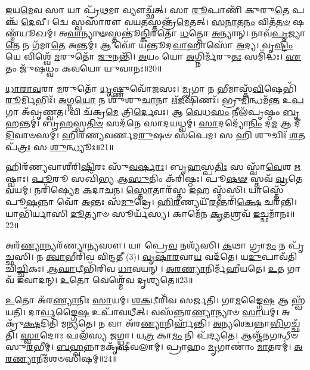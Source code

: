 \-\ul{𑌇}\-𑌯\-\ul{𑌮𑍇}\-𑌵 𑌸𑌾 𑌯𑌾 𑌪𑍍𑌰᳴\-\ul{𑌥}\-𑌮𑌾 𑌵𑍍𑌯𑍗𑌚𑍍𑌛᳴𑌤𑍍।
𑌸𑌾 \ul{𑌰𑍂}\-𑌪𑌾𑌣𑌿᳴ 𑌕𑍁𑌰𑍁\-\ul{𑌤𑍇} 𑌪𑌞𑍍𑌚᳴ \ul{𑌦𑍇}\-𑌵𑍀।
𑌦𑍍𑌵𑍇 𑌸𑍍𑌵𑌸𑌾᳴𑌰𑍗 𑌵𑌯\-\ul{𑌤}\-𑌸𑍍𑌤𑌨𑍍𑌤𑍍𑌰᳴\-\ul{𑌮𑍇}\-𑌤𑌤𑍍।
\-\ul{𑌸}\-\-\ul{𑌨𑌾}\-𑌤\-\ul{𑌨𑌂} 𑌵𑌿𑌤᳴\-\ul{𑌤}\-\-\ul{𑍞} 𑌷𑌣𑍍𑌮᳴𑌯𑍂𑌖𑌮𑍍।
𑌅\-\ul{𑌵𑌾}\-𑌨𑍍𑌯𑌾𑍟𑌸𑍍𑌤𑌨𑍍𑌤𑍂॑\-\ul{𑌨𑍍𑌕𑌿}\-𑌰𑌤𑍋᳴ \ul{𑌧}\-𑌤𑍍𑌤𑍋 \ul{𑌅}\-𑌨𑍍𑌯𑌾𑌨𑍍।
𑌨𑌾𑌵᳴\-\ul{𑌪𑍃}\-𑌜𑍍𑌯𑌾\-\ul{𑌤𑍇} 𑌨 𑌗᳴𑌮𑌾\-\ul{𑌤𑍇} 𑌅𑌨𑍍𑌤𑌮𑍍॑।
𑌆 𑌵𑍋᳴ 𑌯𑌨𑍍𑌤𑍂𑌦\-\ul{𑌵𑌾}\-𑌹𑌾𑌸𑍋᳴ \ul{𑌅}\-𑌦𑍍𑌯।
𑌵𑍃\-\ul{𑌷𑍍𑌟𑌿𑌂} 𑌯𑍇 𑌵𑌿𑌶𑍍𑌵𑍇᳴ \ul{𑌮}\-𑌰𑍁𑌤𑍋᳴ \ul{𑌜𑍁}\-𑌨𑌨𑍍𑌤𑌿᳴।
\-\ul{𑌅}\-𑌯𑌂 𑌯𑍋 \ul{𑌅}\-𑌗𑍍𑌨𑌿𑌰𑍍𑌮᳴𑌰𑍁\-\ul{𑌤𑌃} 𑌸𑌮𑌿᳴𑌦𑍍𑌧𑌃।
\-\ul{𑌏}\-𑌤𑌂 𑌜𑍁᳴𑌷𑌧𑍍𑌵𑌂 𑌕𑌵𑌯𑍋 𑌯𑍁𑌵𑌾𑌨𑌃॥20॥

\-\ul{𑌧𑌾}\-\-\ul{𑌰𑌾}\-\-\ul{𑌵}\-𑌰𑌾 \ul{𑌮}\-𑌰𑍁𑌤𑍋᳴ \ul{𑌧𑍃}\-𑌷𑍍𑌣𑍁𑌵𑍋᳴𑌜𑌸𑌃।
\-\ul{𑌮𑍃}\-𑌗𑌾 𑌨 \ul{𑌭𑍀}\-𑌮𑌾𑌸𑍍𑌤᳴\-\ul{𑌵𑌿}\-𑌷𑍇𑌭𑌿᳴\-\-\ul{𑌰𑍂}\-𑌰𑍍𑌮𑌿𑌭𑌿𑌃᳴।
\-\ul{𑌅}\-𑌗𑍍𑌨\-\ul{𑌯𑍋} 𑌨 𑌶𑍁᳴𑌶𑍁\-\ul{𑌚𑌾}\-𑌨𑌾 𑌋᳴\-\ul{𑌜𑍀}\-𑌷𑌿𑌣𑌃᳴।
𑌭𑍍𑌰𑍁\-\ul{𑌮𑌿}\-𑌨𑍍𑌧𑌮᳴\-\ul{𑌨𑍍𑌤} 𑌉\-\ul{𑌪} 𑌗𑌾 𑌅᳴𑌵𑍃𑌣𑍍𑌵𑌤।
𑌵𑌿 𑌚᳴𑌕𑍍𑌰\-\ul{𑌮𑍇} 𑌤𑍍𑌰𑌿\-\ul{𑌰𑍍𑌦𑍇}\-𑌵𑌃।
𑌆 \ul{𑌵𑍇}\-𑌧\-\ul{𑌸𑌂} 𑌨𑍀𑌲᳴𑌪𑍃𑌷𑍍𑌠𑌂 \ul{𑌬𑍃}\-𑌹𑌨𑍍𑌤𑌮𑍍॑।
𑌬𑍃\-\ul{𑌹}\-𑌸𑍍𑌪\-\ul{𑌤𑌿}\-\-\ul{𑍞} 𑌸𑌦᳴𑌨𑍇 𑌸𑌾𑌦𑌯𑌧𑍍𑌵𑌮𑍍।
\-\ul{𑌸𑌾}\-𑌦𑌦𑍍𑌯𑍋᳴\-\ul{𑌨𑌿𑌂} 𑌦\-\ul{𑌮} 𑌆 𑌦𑍀᳴\-\ul{𑌦𑌿}\-𑌵𑌾𑍞𑌸𑌮𑍍॑।
𑌹𑌿𑌰᳴𑌣𑍍𑌯𑌵𑌰𑍍𑌣𑌮\-\ul{𑌰𑍁}\-𑌷𑍞 𑌸᳴𑌪𑍇𑌮।
𑌸 𑌹𑌿 𑌶𑍁𑌚𑌿𑌃᳴ \ul{𑌶}\-𑌤𑌪᳴\-\ul{𑌤𑍍𑌰𑌃} 𑌸 \ul{𑌶𑍁}\-𑌨𑍍𑌧𑍍𑌯𑍂𑌃॥21॥

𑌹𑌿𑌰᳴𑌣𑍍𑌯𑌵𑌾𑌶𑍀𑌰𑌿\-\ul{𑌷𑌿}\-𑌰𑌃 𑌸𑍁᳴\-\ul{𑌵}\-\-\ul{𑌰𑍍}\-𑌷𑌾𑌃।
𑌬𑍃\-\ul{𑌹}\-𑌸𑍍𑌪\-\ul{𑌤𑌿𑌃} 𑌸 𑌸𑍍𑌵𑌾᳴\-\ul{𑌵𑍇}\-𑌶 \ul{𑌋}\-𑌷𑍍𑌵𑌾𑌃।
\-\ul{𑌪𑍂}\-𑌰𑍂 𑌸𑌖𑌿᳴𑌭𑍍𑌯 𑌆\-\ul{𑌸𑍁}\-𑌤𑌿𑌂 𑌕᳴𑌰𑌿𑌷𑍍𑌠𑌃।
𑌪𑍂\-\ul{𑌷}\-\-\ul{𑍟} 𑌸𑍍𑌤𑌵᳴ \ul{𑌵𑍍𑌰}\-𑌤𑍇 \ul{𑌵}\-𑌯𑌮𑍍।
𑌨𑌰𑌿᳴𑌷𑍍𑌯𑍇𑌮 \ul{𑌕}\-𑌦𑌾\-\ul{𑌚}\-𑌨।
\-\ul{𑌸𑍍𑌤𑍋}\-𑌤𑌾𑌰᳴𑌸𑍍𑌤 \ul{𑌇}\-𑌹 𑌸𑍍𑌮᳴𑌸𑌿।
𑌯𑌾𑌸𑍍𑌤𑍇᳴ 𑌪𑍂\-\ul{𑌷}\-𑌨𑍍𑌨𑌾 𑌵𑍋᳴ \ul{𑌅}\-𑌨𑍍𑌤𑌃 𑌸᳴\-\ul{𑌮𑍁}\-𑌦𑍍𑌰𑍇।
\-\ul{𑌹𑌿}\-\-\ul{𑌰}\-𑌣𑍍𑌯𑌯𑍀᳴\-\ul{𑌰}\-𑌨𑍍𑌤𑌰𑌿᳴\-\ul{𑌕𑍍𑌷𑍇} 𑌚𑌰᳴𑌨𑍍𑌤𑌿।
𑌯𑌾𑌭𑌿᳴𑌰𑍍𑌯𑌾𑌸𑌿 \ul{𑌦𑍂}\-𑌤𑍍𑌯𑌾𑍞 𑌸𑍂𑌰𑍍𑌯᳴𑌸𑍍𑌯।
𑌕𑌾𑌮𑍇᳴𑌨 \ul{𑌕𑍃}\-𑌤𑌶𑍍𑌰𑌵᳴ \ul{𑌇}\-𑌚𑍍𑌛𑌮𑌾᳴𑌨𑌃॥22॥

𑌅𑌰᳴\-\ul{𑌣𑍍𑌯𑌾}\-𑌨𑍍𑌯𑌰᳴𑌣𑍍𑌯𑌾\-\ul{𑌨𑍍𑌯}\-𑌸𑍗।
𑌯𑌾 𑌪𑍍𑌰𑍇\-\ul{𑌵} 𑌨𑌶𑍍𑌯᳴𑌸𑌿।
\-\ul{𑌕}\-𑌥𑌾 𑌗𑍍𑌰𑌾\-\ul{𑌮𑌂} 𑌨 𑌪𑍃᳴𑌚𑍍𑌛𑌸𑌿।
𑌨 \ul{𑌤𑍍𑌵𑌾}\-𑌭𑍀𑌰𑌿᳴𑌵 𑌵𑌿𑌨𑍍𑌦𑌤𑍀 (3)।
\-\ul{𑌵𑍃}\-\-\ul{𑌷𑌾}\-\-\ul{𑌰}\-𑌵𑌾\-\ul{𑌯} 𑌵𑌦᳴𑌤𑍇।
𑌯\-\ul{𑌦𑍁}\-𑌪𑌾𑌵᳴𑌤𑌿 𑌚𑌿\-\ul{𑌚𑍍𑌚𑌿}\-𑌕𑌃।
\-\ul{𑌆}\-\-\ul{𑌘𑌾}\-𑌟𑍀𑌭𑌿᳴𑌰𑌿𑌵 \ul{𑌧𑌾}\-𑌵𑌯𑌨𑍍।
\-\ul{𑌅}\-\-\ul{𑌰}\-\-\ul{𑌣𑍍𑌯𑌾}\-𑌨𑌿𑌰𑍍𑌮᳴𑌹𑍀𑌯𑌤𑍇।
\-\ul{𑌉}\-𑌤 𑌗𑌾𑌵᳴ 𑌇𑌵𑌾𑌦𑌨𑍍।
\-\ul{𑌉}\-𑌤𑍋 𑌵𑍇𑌶𑍍𑌮𑍇᳴𑌵 𑌦𑍃𑌶𑍍𑌯𑌤𑍇॥23॥

\-\ul{𑌉}\-𑌤𑍋 𑌅᳴𑌰\-\ul{𑌣𑍍𑌯𑌾}\-𑌨𑌿𑌃 \ul{𑌸𑌾}\-𑌯𑌮𑍍।
\-\ul{𑌶}\-\-\ul{𑌕}\-𑌟𑍀𑌰𑌿᳴𑌵 𑌸𑌰𑍍𑌜𑌤𑌿।
𑌗𑌾\-\ul{𑌮}\-𑌙𑍍𑌗𑍈\-\ul{𑌷} 𑌆 𑌹𑍍𑌵᳴𑌯𑌤𑌿।
𑌦𑌾\-\ul{𑌰𑍍𑌵}\-𑌙𑍍𑌗𑍈\-\ul{𑌷} 𑌉𑌪𑌾᳴𑌵𑌧𑍀𑌤𑍍।
𑌵𑌸᳴𑌨𑍍𑌨𑌰\-\ul{𑌣𑍍𑌯𑌾}\-𑌨𑍍𑌯𑌾𑍞 \ul{𑌸𑌾}\-𑌯𑌮𑍍।
𑌅𑌕𑍍𑌰𑍁᳴\-\ul{𑌕𑍍𑌷}\-𑌦𑌿𑌤𑌿᳴ 𑌮𑌨𑍍𑌯𑌤𑍇।
𑌨 𑌵𑌾 𑌅᳴𑌰\-\ul{𑌣𑍍𑌯𑌾}\-𑌨𑌿𑌰𑍍\mbox{}𑌹᳴𑌨𑍍𑌤𑌿।
\-\ul{𑌅}\-𑌨𑍍𑌯𑌶𑍍𑌚𑍇𑌨𑍍𑌨𑌾\-\ul{𑌭𑌿}\-𑌗𑌚𑍍𑌛᳴𑌤𑌿।
\-\ul{𑌸𑍍𑌵𑌾}\-𑌦𑍋𑌃 𑌫𑌲᳴𑌸𑍍𑌯 \ul{𑌜}\-𑌗𑍍𑌧𑍍𑌵𑌾।
𑌯\-\ul{𑌤𑍍𑌰} 𑌕𑌾\-\ul{𑌮𑌂} 𑌨𑌿 𑌪᳴𑌦𑍍𑌯𑌤𑍇।
𑌆𑌞𑍍𑌜᳴𑌨𑌗𑌨𑍍𑌧𑍀𑍞 𑌸𑍁\-\ul{𑌰}\-𑌭𑍀𑌮𑍍।
\-\ul{𑌬}\-\-\ul{𑌹𑍍𑌵}\-𑌨𑍍𑌨𑌾𑌮𑌕𑍃᳴𑌷𑍀𑌵𑌲𑌾𑌮𑍍।
𑌪𑍍𑌰𑌾𑌹𑌂 \ul{𑌮𑍃}\-𑌗𑌾𑌣𑌾𑌂॑ \ul{𑌮𑌾}\-𑌤𑌰𑌮𑍍॑।
\-\ul{𑌅}\-\-\ul{𑌰}\-\-\ul{𑌣𑍍𑌯𑌾}\-𑌨𑍀𑌮᳴𑌶𑍞𑌸𑌿𑌷𑌮𑍍॥24॥\anuvakamend[\-\ul{𑌸𑍍𑌯𑌾}\-\-\ul{𑌮} \ul{𑌰𑍁}\-\-\ul{𑌰𑍋}\-\-\ul{𑌹} \ul{𑌯𑍁}\-\-\ul{𑌵𑌾}\-\-\ul{𑌨𑌃} \ul{𑌶𑍁}\-𑌨𑍍𑌧𑍍𑌯𑍂\-\ul{𑌰𑌿}\-𑌚𑍍𑌛𑌮𑌾᳴𑌨𑍋 𑌦𑍃𑌶𑍍𑌯\-\ul{𑌤𑍇} 𑌨𑌿𑌪᳴𑌦𑍍𑌯𑌤𑍇 \ul{𑌚}\-𑌤𑍍𑌵𑌾𑌰𑌿᳴ 𑌚]

